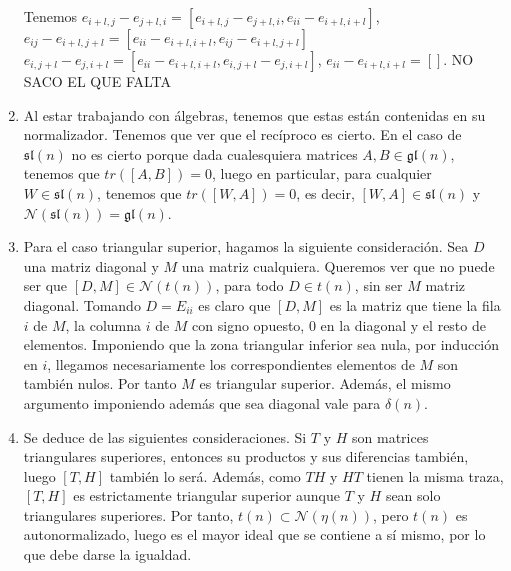 \documentclass[twoside]{article}
\begin{document}
\begin{solucion}
\begin{enumerate}
	Tenemos $e_{i+l,j}-e_{j+l,i}=[e_{i+l,j}-e_{j+l,i},e_{ii}-e_{i+l,i+l}]$, $e_{ij}-e_{i+l,j+l}=[e_{ii}-e_{i+l,i+l},e_{ij}-e_{i+l,j+l}]$ $e_{i,j+l}-e_{j,i+l}=[e_{ii}-e_{i+l,i+l},e_{i,j+l}-e_{j,i+l}]$, $e_{ii}-e_{i+l,i+l}=[]$. NO SACO EL QUE FALTA

\item Al estar trabajando con álgebras, tenemos que estas están contenidas en su normalizador. Tenemos que ver que el recíproco es cierto. En el caso de $\mathfrak{sl}(n)$ no es cierto porque dada cualesquiera matrices $A,B\in\mathfrak{gl}(n)$, tenemos que $tr([A,B])=0$, luego en particular, para cualquier $W\in \mathfrak{sl}(n)$, tenemos que $tr([W,A])=0$, es decir, $[W,A]\in\mathfrak{sl}(n)$ y $\mathcal{N}(\mathfrak{sl}(n))=\mathfrak{gl}(n)$. %

\item 
Para el caso triangular superior, hagamos la siguiente consideración. Sea $D$ una matriz diagonal y $M$ una matriz cualquiera. Queremos ver que no puede ser que $[D,M] \in \mathcal{N}(t(n))$, para todo $D\in t(n)$, sin ser $M$ matriz diagonal. Tomando $D=E_{ii}$ es claro que $[D,M]$ es la matriz que tiene la fila $i$ de $M$, la columna $i$ de $M$ con signo opuesto, $0$ en la diagonal y el resto de elementos. Imponiendo que la zona triangular inferior sea nula, por inducción en $i$, llegamos  necesariamente los correspondientes elementos de $M$ son también nulos. Por tanto $M$ es triangular superior. Además, el mismo argumento imponiendo además que sea diagonal vale para $\delta(n)$.

\item Se deduce de las siguientes consideraciones. Si $T$ y $H$ son matrices triangulares superiores, entonces su productos y sus diferencias también, luego $[T,H]$ también lo será. Además, como $TH$ y $HT$ tienen la misma traza, $[T,H]$ es estrictamente triangular superior aunque $T$ y $H$ sean solo triangulares superiores. Por tanto, $t(n) \subset \mathcal{N}(\eta(n))$, pero $t(n)$ es autonormalizado, luego es el mayor ideal que se contiene a sí mismo, por lo que debe darse la igualdad. 
\end{enumerate}
\end{solucion}
\end{document}
